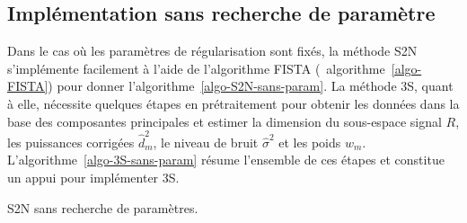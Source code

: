     \subsection{Implémentation sans recherche de paramètre}

    Dans le cas où les paramètres de régularisation sont fixés, la méthode S2N s'implémente facilement à l'aide de l'algorithme FISTA (\cf\ algorithme~\ref{algo-FISTA}) pour donner l'algorithme~\ref{algo-S2N-sans-param}. La méthode 3S, quant à elle, nécessite quelques étapes en prétraitement pour obtenir les données dans la base des composantes principales et estimer la dimension du sous-espace signal $R$, les puissances corrigées $\hat{d}_m^2$, le niveau de bruit $\hat{\sigma}^2$ et les poids $w_m$. L'algorithme~\ref{algo-3S-sans-param} résume l'ensemble de ces étapes et constitue un appui pour implémenter 3S. 

    \begin{normalalgorithme*}
        \begin{minipage}{\textwidth}
            \begin{algorithm}[H]
                \medskip
                \medskip
            \end{algorithm}
        \end{minipage}
        \caption{S2N sans recherche de paramètres.\protect\label{algo-S2N-sans-param}}
    \end{normalalgorithme*}



